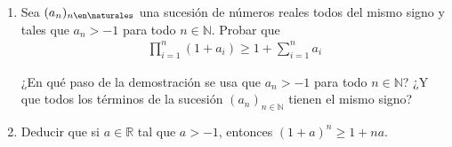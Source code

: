 \begin{enunciado}{\ejercicio}
  \begin{enumerate}[label=\roman*)]
    \item Sea $(a_n)_{n \en \naturales }$ una sucesión de números reales todos del mismo signo y tales que 
    $a_n > -1$ para todo $n \in \mathbb{N}$. Probar que 
    \begin{align*}
      \prod_{i=1}^{n} (1 + a_i) \geq 1 + \sum_{i=1}^{n}a_i
    \end{align*}
          
    ¿En qué paso de la demostración se usa que $a_n > -1$ para todo $n \in \mathbb{N}$? ¿Y que todos los términos
    de la sucesión $(a_n)_{n \in \mathbb{N}}$ tienen el mismo signo?

    \item Deducir que si $a \in \mathbb{R}$ tal que $a > -1$, entonces $(1+a)^n \geq 1 + na$.
  \end{enumerate}
\end{enunciado}
\setcounter{equation}{0}
